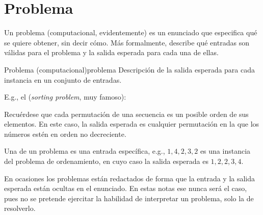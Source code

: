 \section{Problema}
\label{sec:problema}

Un problema (computacional, evidentemente) es un enunciado que especifica qué se quiere obtener, sin decir cómo. Más formalmente, describe qué entradas son válidas para el problema y la salida esperada para cada una de ellas.
\begin{definicion}{Problema (computacional)}{problema}
Descripción de la salida esperada para cada instancia en un conjunto de entradas.
\end{definicion}

E.g., el  (\textit{sorting problem}, muy famoso):
\begin{especificacion}
\end{especificacion}
Recuérdese que cada permutación de una secuencia es un posible orden de sus elementos. En este caso, la salida esperada es cualquier permutación en la que los números estén en orden no decreciente.

Una  de un problema es una entrada específica, e.g., \(1, 4, 2, 3, 2\) es una instancia del problema de ordenamiento, en cuyo caso la salida esperada es \(1, 2, 2, 3, 4\).

En ocasiones los problemas están redactados de forma que la entrada y la salida esperada están ocultas en el enunciado. En estas notas ese nunca será el caso, pues no se pretende ejercitar la habilidad de interpretar un problema, solo la de resolverlo.

